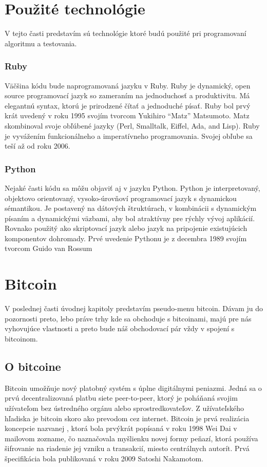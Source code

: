 \section{Použité technológie} 
V tejto časti predstavím sú technológie ktoré budú použité pri programovaní algoritmu a testovania.
\subsubsection{Ruby}
Väčšina kódu bude naprogramovaná jazyku v Ruby. Ruby je dynamický, open source programovací jazyk so zameraním na jednoduchosť a produktivitu. Má elegantnú syntax, ktorú je prirodzené čítať a jednoduché písať. Ruby bol prvý krát uvedený v roku 1995 svojím tvorcom Yukihiro “Matz” Matsumoto. Matz skombinoval svoje obľúbené jazyky (Perl, Smalltalk, Eiffel, Ada, and Lisp). Ruby je vyvážením funkcionálneho a imperatívneho programovania. Svojej obľube sa teší až od roku 2006.\cite{Rb} 
\subsubsection{Python} 
Nejaké časti kódu sa môžu objaviť aj v jazyku Python. Python je interpretovaný, objektovo orientovaný, vysoko-úrovňoví programovací jazyk s dynamickou sémantikou. Je postavený na dátových štruktúrach, v kombinácii s dynamickým písaním a dynamickými väzbami, aby bol atraktívny pre rýchly vývoj aplikácií. Rovnako použitý ako skriptovací jazyk alebo  jazyk na pripojenie existujúcich komponentov dohromady. Prvé uvedenie Pythonu je z decembra 1989 svojím tvorcom Guido van Rossum\cite{Pt} 
\section{Bitcoin} 
V poslednej časti úvodnej kapitoly predstavím pseudo-menu bitcoin. Dávam ju do pozornosti preto, lebo práve trhy kde sa obchoduje s bitcoinami, majú pre nás vyhovujúce vlastnosti a preto bude náš obchodovací pár vždy v spojení s bitcoinom.
\subsection{O bitcoine} 
Bitcoin umožňuje nový platobný systém s úplne digitálnymi peniazmi. Jedná sa o prvú decentralizovaná platbu siete peer-to-peer, ktorý je poháňaná svojim užívateľom bez ústredného orgánu alebo sprostredkovateľov. Z užívateľského hľadiska je bitcoin skoro ako prevodom cez internet. Bitcoin je prvá realizácia koncepcie nazvanej , ktorá bola prvýkrát popísaná v roku 1998 Wei Dai v  mailovom zozname, čo naznačovala myšlienku novej formy peňazí, ktorá používa šifrovanie na riadenie jej vzniku a transakcií, miesto centrálnych autorít.  Prvá špecifikácia bola publikovaná v roku 2009  Satoshi Nakamotom. 
